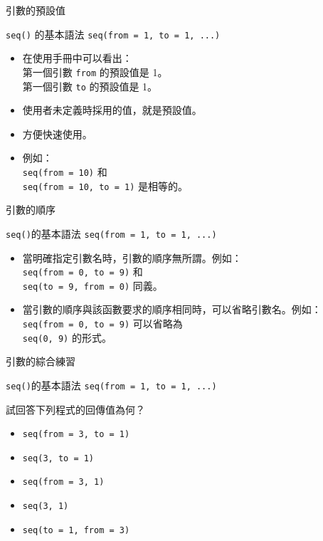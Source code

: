 \documentclass[12pt, aspectratio=43]{beamer}
\begin{document}
\begin{frame}[fragile]{引數的預設值}

\begin{block}{\texttt{seq()} 的基本語法}
\verb+seq(from = 1, to = 1, ...)+ \\
\end{block}
\begin{itemize}
\item 在使用手冊中可以看出：
  \\ 第一個引數 \verb+from+ 的預設值是 1。
  \\ 第一個引數 \verb+to+ 的預設值是 1。
\item 使用者未定義時採用的值，就是預設值。
\item 方便快速使用。
\item 例如：\\
  \verb+seq(from = 10)+ 和 \\
  \verb+seq(from = 10, to = 1)+ 是相等的。
\end{itemize}
\end{frame}


\begin{frame}[fragile]{引數的順序}

\begin{block}{\texttt{seq()}的基本語法}
\verb+seq(from = 1, to = 1, ...)+ \\
\end{block}

\begin{itemize}
\item 當明確指定引數名時，引數的順序無所謂。例如：\\ \verb+seq(from = 0, to = 9)+ 和 \\ \verb+seq(to = 9, from = 0)+ 同義。
\item 當引數的順序與該函數要求的順序相同時，可以省略引數名。例如：\\ \verb+seq(from = 0, to = 9)+ 可以省略為 \\ \verb+seq(0, 9)+ 的形式。
\end{itemize}
\end{frame}


\begin{frame}[fragile]{引數的綜合練習}

\begin{block}{\texttt{seq()}的基本語法}
\verb+seq(from = 1, to = 1, ...)+ \\
\end{block}

試回答下列程式的回傳值為何？
\begin{itemize}
\item \verb+seq(from = 3, to = 1)+
\item \verb+seq(3, to = 1)+
\item \verb+seq(from = 3, 1)+
\item \verb+seq(3, 1)+
\item \verb+seq(to = 1, from = 3)+
\end{itemize}
\end{frame}
\end{document}
